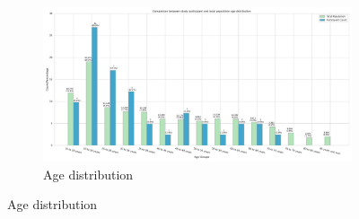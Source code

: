 \begin{figure}[ht]
    \centering
    \begin{subfigure}[b]{0.8\textwidth}
        \centering
        \includegraphics[width=\textwidth]{content/image/demo/demo_age_group_vertical.pdf}
        \caption{Age distribution}
        \label{fig:demoAge}
    \end{subfigure}
    
    \vspace{0.5cm} %


\end{figure}
